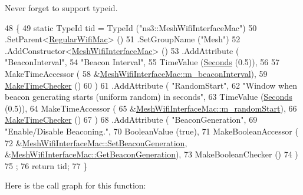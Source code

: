 Never forget to support typeid. 


\begin{DoxyCode}
48 \{
49   \textcolor{keyword}{static} TypeId tid = TypeId (\textcolor{stringliteral}{"ns3::MeshWifiInterfaceMac"})
50     .SetParent<\hyperlink{classns3_1_1RegularWifiMac_a56bc0e2b8ecde6fc50e6f8921ce64957}{RegularWifiMac}> ()
51     .SetGroupName (\textcolor{stringliteral}{"Mesh"})
52     .AddConstructor<\hyperlink{classns3_1_1MeshWifiInterfaceMac_a0af11c7466d83a1b0832d0a353438dec}{MeshWifiInterfaceMac}> ()
53     .AddAttribute ( \textcolor{stringliteral}{"BeaconInterval"},
54                     \textcolor{stringliteral}{"Beacon Interval"},
55                     TimeValue (\hyperlink{group__timecivil_ga33c34b816f8ff6628e33d5c8e9713b9e}{Seconds} (0.5)),
56 
57                     MakeTimeAccessor (
58                       &\hyperlink{classns3_1_1MeshWifiInterfaceMac_a106e67903abbdb360b51ce457b6d315b}{MeshWifiInterfaceMac::m\_beaconInterval}),
59                     \hyperlink{group__time_ga7032965bd4afa578691d88c09e4481c1}{MakeTimeChecker} ()
60                     )
61     .AddAttribute ( \textcolor{stringliteral}{"RandomStart"},
62                     \textcolor{stringliteral}{"Window when beacon generating starts (uniform random) in seconds"},
63                     TimeValue (\hyperlink{group__timecivil_ga33c34b816f8ff6628e33d5c8e9713b9e}{Seconds} (0.5)),
64                     MakeTimeAccessor (
65                       &\hyperlink{classns3_1_1MeshWifiInterfaceMac_ac5bcacc9a26b26fade1fd72e980ebd68}{MeshWifiInterfaceMac::m\_randomStart}),
66                     \hyperlink{group__time_ga7032965bd4afa578691d88c09e4481c1}{MakeTimeChecker} ()
67                     )
68     .AddAttribute ( \textcolor{stringliteral}{"BeaconGeneration"},
69                     \textcolor{stringliteral}{"Enable/Disable Beaconing."},
70                     BooleanValue (\textcolor{keyword}{true}),
71                     MakeBooleanAccessor (
72                       &\hyperlink{classns3_1_1MeshWifiInterfaceMac_a850bda1e62a17dee6211e5423878c948}{MeshWifiInterfaceMac::SetBeaconGeneration}, 
      &\hyperlink{classns3_1_1MeshWifiInterfaceMac_abdace2200ebbe675f7c9e40d9c1bca40}{MeshWifiInterfaceMac::GetBeaconGeneration}),
73                     MakeBooleanChecker ()
74                     )
75   ;
76   \textcolor{keywordflow}{return} tid;
77 \}
\end{DoxyCode}


Here is the call graph for this function\+:


